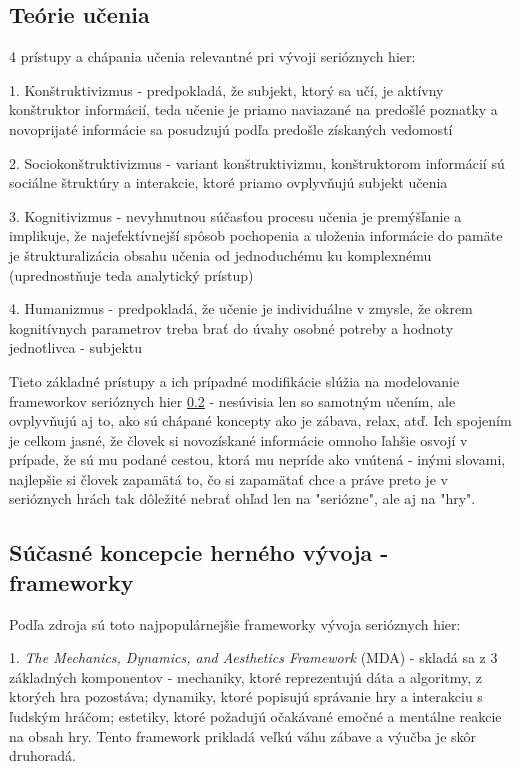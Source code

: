 \documentclass[10pt,twoside,slovak,a4paper]{article}
\begin{document}
\subsection{Teórie učenia} \label{jadro:teorie}
4 prístupy a chápania učenia relevantné pri vývoji serióznych hier:

1. Konštruktivizmus - predpokladá, že subjekt, ktorý sa učí, je aktívny konštruktor informácií, teda učenie je priamo naviazané na predošlé poznatky a novoprijaté informácie sa posudzujú podľa predošle získaných vedomostí

2. Sociokonštruktivizmus - variant konštruktivizmu, konštruktorom informácií sú sociálne štruktúry a interakcie, ktoré priamo ovplyvňujú subjekt učenia

3. Kognitivizmus - nevyhnutnou súčasťou procesu učenia je premýšľanie a implikuje, že najefektívnejší spôsob pochopenia a uloženia informácie do pamäte je štrukturalizácia obsahu učenia od jednoduchému ku komplexnému (uprednostňuje teda analytický prístup)

4. Humanizmus - predpokladá, že učenie je individuálne v zmysle, že okrem kognitívnych parametrov treba brať do úvahy osobné potreby a hodnoty jednotlivca - subjektu

Tieto základné prístupy a ich prípadné modifikácie slúžia na modelovanie frameworkov serióznych hier \ref{jadro:frameworky} - nesúvisia len so samotným učením, ale ovplyvňujú aj to, ako sú chápané koncepty ako je zábava, relax, atď. Ich spojením je celkom jasné, že človek si novozískané informácie omnoho ľahšie osvojí v prípade, že sú mu podané cestou, ktorá mu nepríde ako vnútená - inými slovami, najlepšie si človek zapamätá to, čo si zapamätať chce a práve preto je v serióznych hrách tak dôležité nebrať ohľad len na "seriózne", ale aj na "hry".

\subsection{Súčasné koncepcie herného vývoja - frameworky} \label{jadro:frameworky}
Podľa zdroja \cite{natucci2021experience} sú toto najpopulárnejšie frameworky vývoja serióznych hier:

1. \emph{The Mechanics, Dynamics, and Aesthetics Framework} (MDA) - skladá sa z 3 základných komponentov - mechaniky, ktoré reprezentujú dáta a algoritmy, z ktorých hra pozostáva; dynamiky, ktoré popisujú správanie hry a interakciu s ľudským hráčom; estetiky, ktoré požadujú očakávané emočné a mentálne reakcie na obsah hry. Tento framework prikladá veľkú váhu zábave a výučba je skôr druhoradá.
\end{document}
